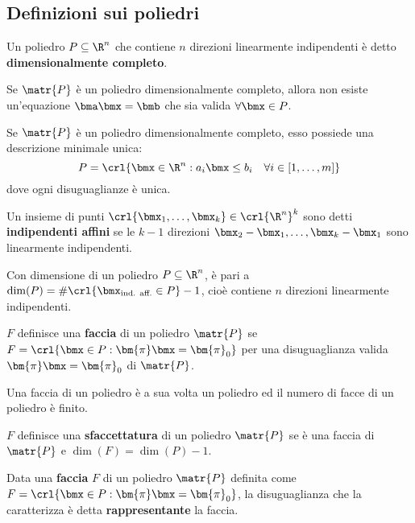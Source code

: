 \documentclass[\main/main.tex]{subfiles}
\begin{document}
\subsection{Definizioni sui poliedri}
\begin{definition}
    Un poliedro \(P\subseteq\R^n\) che contiene \(n\) direzioni linearmente indipendenti è detto \textbf{dimensionalmente completo}.
\end{definition}

\begin{proposition}
    Se \(\matr{P}\) è un poliedro dimensionalmente completo, allora non esiste un'equazione \(\bma\bmx = \bmb \) che sia valida \(\forall \bmx \in P\).
\end{proposition}

\begin{theorem}
    Se \(\matr{P}\) è un poliedro dimensionalmente completo, esso possiede una descrizione minimale unica:
    \[
        P = \crl{\bmx \in \R^n: a_i\bmx \leq b_i \quad \forall i \in [1, \ldots, m]}
    \]    dove ogni disuguaglianze è unica.
\end{theorem}
\begin{definition}
    Un insieme di punti \(\crl{\bmx_1, \ldots, \bmx_k} \in \crl{\R^n}^k\) sono detti \textbf{indipendenti affini} se le \(k-1\) direzioni \(\bmx_2 - \bmx_1, \ldots, \bmx_k - \bmx_1\) sono linearmente indipendenti.
\end{definition}
\begin{definition}
    Con dimensione di un poliedro \(P\subseteq \R^n\), è pari a \(\dim(P) = \#\crl{\bmx_{\text{ind. aff.}} \in P} -1\), cioè contiene \(n\) direzioni linearmente indipendenti.
\end{definition}
\begin{definition}
    \(F\) definisce una \textbf{faccia} di un poliedro \(\matr{P}\) se \(F = \crl{\bmx \in P: \bm{\pi}\bmx = \bm{\pi}_0}\) per una disuguaglianza valida \(\bm{\pi}\bmx = \bm{\pi}_0\) di \(\matr{P}\).

    Una faccia di un poliedro è a sua volta un poliedro ed il numero di facce di un poliedro è finito.
\end{definition}
\begin{definition}
    \(F\) definisce una \textbf{sfaccettatura} di un poliedro \(\matr{P}\) se è una faccia di \(\matr{P}\) e \(\dim(F) = \dim(P) -1\).
\end{definition}
\begin{definition}
    Data una \textbf{faccia} \(F\) di un poliedro \(\matr{P}\) definita come \(F = \crl{\bmx \in P: \bm{\pi}\bmx = \bm{\pi}_0}\), la disuguaglianza che la caratterizza è detta \textbf{rappresentante} la faccia.
\end{definition}
\end{document}
